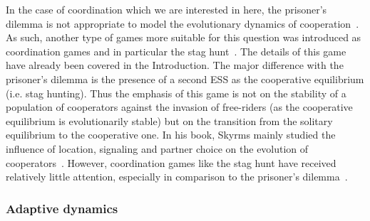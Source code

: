             In the case of coordination which we are interested in here, the prisoner's dilemma is not appropriate to model the evolutionary dynamics of cooperation~\parencite{Alvard2002, Skyrms2004}. As such, another type of games more suitable for this question was introduced as coordination games and in particular the stag hunt~\parencite{Skyrms2004, Requejo2013a}. The details of this game have already been covered in the Introduction. The major difference with the prisoner's dilemma is the presence of a second ESS as the cooperative equilibrium (i.e. stag hunting). Thus the emphasis of this game is not on the stability of a population of cooperators against the invasion of free-riders (as the cooperative equilibrium is evolutionarily stable) but on the transition from the solitary equilibrium to the cooperative one. In his book, Skyrms mainly studied the influence of location, signaling and partner choice on the evolution of cooperators~\parencite{Skyrms2004}. However, coordination games like the stag hunt have received relatively little attention, especially in comparison to the prisoner's dilemma~\parencite{Iyer2016}.



        \subsubsection{Adaptive dynamics}

